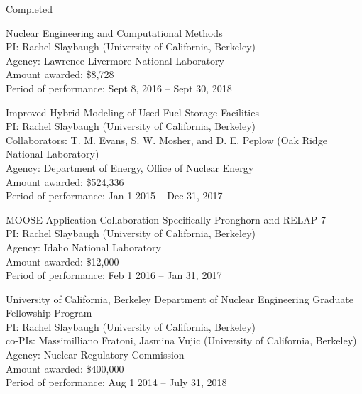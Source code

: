 
\begin{rSubsection}{Completed}{}{}{}
\item Nuclear Engineering and Computational Methods\\
PI: Rachel Slaybaugh (University of California, Berkeley)\\
Agency: Lawrence Livermore National Laboratory \\
Amount awarded: \$8,728\\
Period of performance: Sept 8, 2016 -- Sept 30, 2018	

\vspace*{0.3 em}
\item Improved Hybrid Modeling of Used Fuel Storage Facilities\\
PI: Rachel Slaybaugh (University of California, Berkeley)\\
\hspace*{1 em}  Collaborators: T. M. Evans, S. W. Mosher, and D. E. Peplow (Oak Ridge National Laboratory)\\
Agency: Department of Energy, Office of Nuclear Energy \\
Amount awarded: \$524,336\\
Period of performance: Jan 1 2015 -- Dec 31, 2017

\vspace*{0.3 em}
\item MOOSE Application Collaboration Specifically Pronghorn and RELAP-7\\ 
PI: Rachel Slaybaugh (University of California, Berkeley)\\
Agency: Idaho National Laboratory \\
Amount awarded: \$12,000\\
Period of performance: Feb 1 2016 -- Jan 31, 2017

\vspace*{0.3 em}
\item University of California, Berkeley Department of Nuclear Engineering Graduate Fellowship Program\\ 
PI: Rachel Slaybaugh (University of California, Berkeley)\\
\hspace*{1 em} co-PIs: Massimilliano Fratoni, Jasmina Vujic (University of California, Berkeley)\\
Agency: Nuclear Regulatory Commission \\
Amount awarded: \$400,000\\
Period of performance: Aug 1 2014 -- July 31, 2018


\end{rSubsection}
